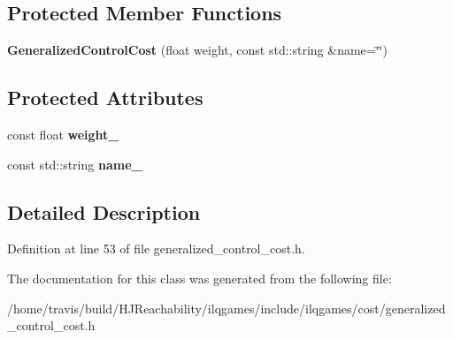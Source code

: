 \subsection*{Protected Member Functions}
\begin{DoxyCompactItemize}
\item 
{\bfseries Generalized\+Control\+Cost} (float weight, const std\+::string \&name=\char`\"{}\char`\"{})\hypertarget{classilqgames_1_1_generalized_control_cost_a20ec89b74138b70bd9b26208b4e0a234}{}\label{classilqgames_1_1_generalized_control_cost_a20ec89b74138b70bd9b26208b4e0a234}

\end{DoxyCompactItemize}
\subsection*{Protected Attributes}
\begin{DoxyCompactItemize}
\item 
const float {\bfseries weight\+\_\+}\hypertarget{classilqgames_1_1_generalized_control_cost_a6e6aa59c9d270b8de4ad9c2a3722c96e}{}\label{classilqgames_1_1_generalized_control_cost_a6e6aa59c9d270b8de4ad9c2a3722c96e}

\item 
const std\+::string {\bfseries name\+\_\+}\hypertarget{classilqgames_1_1_generalized_control_cost_ac0f3ae978f1955a4c4e9043aff8eb792}{}\label{classilqgames_1_1_generalized_control_cost_ac0f3ae978f1955a4c4e9043aff8eb792}

\end{DoxyCompactItemize}


\subsection{Detailed Description}


Definition at line 53 of file generalized\+\_\+control\+\_\+cost.\+h.



The documentation for this class was generated from the following file\+:\begin{DoxyCompactItemize}
\item 
/home/travis/build/\+H\+J\+Reachability/ilqgames/include/ilqgames/cost/generalized\+\_\+control\+\_\+cost.\+h\end{DoxyCompactItemize}
